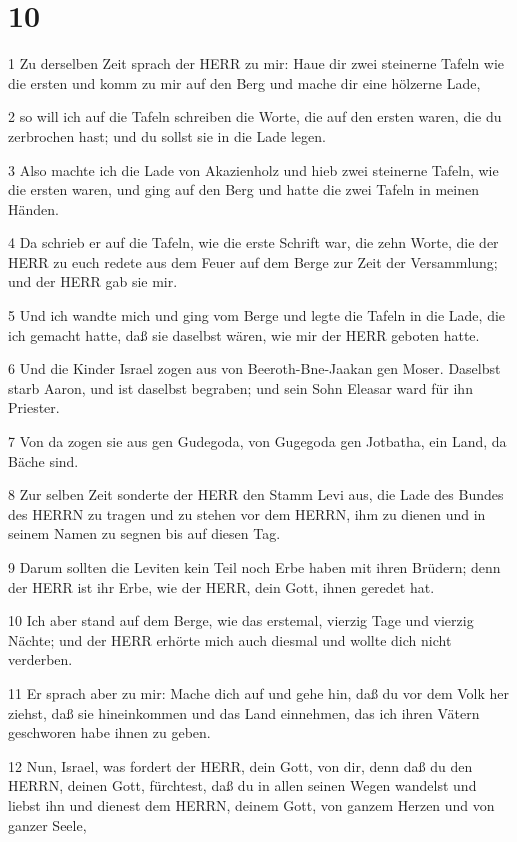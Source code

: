 \chapter{10}

\par 1 Zu derselben Zeit sprach der HERR zu mir: Haue dir zwei steinerne Tafeln wie die ersten und komm zu mir auf den Berg und mache dir eine hölzerne Lade,
\par 2 so will ich auf die Tafeln schreiben die Worte, die auf den ersten waren, die du zerbrochen hast; und du sollst sie in die Lade legen.
\par 3 Also machte ich die Lade von Akazienholz und hieb zwei steinerne Tafeln, wie die ersten waren, und ging auf den Berg und hatte die zwei Tafeln in meinen Händen.
\par 4 Da schrieb er auf die Tafeln, wie die erste Schrift war, die zehn Worte, die der HERR zu euch redete aus dem Feuer auf dem Berge zur Zeit der Versammlung; und der HERR gab sie mir.
\par 5 Und ich wandte mich und ging vom Berge und legte die Tafeln in die Lade, die ich gemacht hatte, daß sie daselbst wären, wie mir der HERR geboten hatte.
\par 6 Und die Kinder Israel zogen aus von Beeroth-Bne-Jaakan gen Moser. Daselbst starb Aaron, und ist daselbst begraben; und sein Sohn Eleasar ward für ihn Priester.
\par 7 Von da zogen sie aus gen Gudegoda, von Gugegoda gen Jotbatha, ein Land, da Bäche sind.
\par 8 Zur selben Zeit sonderte der HERR den Stamm Levi aus, die Lade des Bundes des HERRN zu tragen und zu stehen vor dem HERRN, ihm zu dienen und in seinem Namen zu segnen bis auf diesen Tag.
\par 9 Darum sollten die Leviten kein Teil noch Erbe haben mit ihren Brüdern; denn der HERR ist ihr Erbe, wie der HERR, dein Gott, ihnen geredet hat.
\par 10 Ich aber stand auf dem Berge, wie das erstemal, vierzig Tage und vierzig Nächte; und der HERR erhörte mich auch diesmal und wollte dich nicht verderben.
\par 11 Er sprach aber zu mir: Mache dich auf und gehe hin, daß du vor dem Volk her ziehst, daß sie hineinkommen und das Land einnehmen, das ich ihren Vätern geschworen habe ihnen zu geben.
\par 12 Nun, Israel, was fordert der HERR, dein Gott, von dir, denn daß du den HERRN, deinen Gott, fürchtest, daß du in allen seinen Wegen wandelst und liebst ihn und dienest dem HERRN, deinem Gott, von ganzem Herzen und von ganzer Seele,
